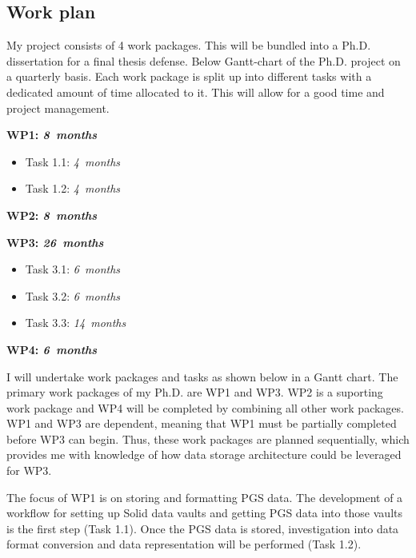 \documentclass[a4paper,11pt]{article}
\begin{document}
\begin{refsection}
\subsection{Work plan}
\smallskip

\noindent
My project consists of 4 work packages. 
This will be bundled into a Ph.D. dissertation for a final thesis defense.
Below Gantt-chart of the Ph.D. project on a quarterly basis.  
Each work package is split up into different tasks with a dedicated amount of time allocated to it. 
This will allow for a good time and project management. 

\begin{adjustwidth}{0cm}{0cm}
	\parindent 0pt
	\newcommand\duration[1]{\hfill\emph{#1~months}}
  
	\textbf{WP1:      \WPa  \duration{8}}
	\begin{itemize}
	  \item Task 1.1: \WPaa \duration{ 4}
	  \item Task 1.2: \WPab \duration{ 4}
	\end{itemize}
	\smallskip
  
	\textbf{WP2:      \WPb  \duration{8}}
	\smallskip
	
	\textbf{WP3:      \WPc  \duration{26}}
	\begin{itemize}
	  \item Task 3.1: \WPca \duration{ 6}
	  \item Task 3.2: \WPcb \duration{ 6}
	  \item Task 3.3: \WPcc \duration{ 14}
	\end{itemize}
	\smallskip
	
	\textbf{WP4:      \WPd  \duration{ 6}}
\end{adjustwidth}

\noindent
I will undertake work packages and tasks as shown below in a Gantt chart.
The primary work packages of my Ph.D. are WP1 and WP3.
WP2 is a suporting work package and WP4 will be completed by combining all other work packages.
WP1 and WP3 are dependent, meaning that WP1 must be partially completed before WP3 can begin.
Thus, these work packages are planned sequentially, which provides me with knowledge of how data storage architecture could be leveraged for WP3.

The focus of WP1 is on storing and formatting PGS data.
The development of a workflow for setting up Solid data vaults and getting PGS data into those vaults is the first step (Task 1.1).
Once the PGS data is stored, investigation into data format conversion and data representation will be performed (Task 1.2).


\end{refsection}
\end{document}
